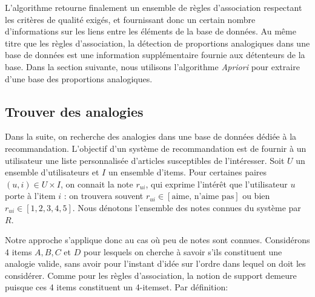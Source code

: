 L'algorithme retourne finalement un ensemble de règles d'association
respectant les critères de qualité exigés, et fournissant donc un certain
nombre d'informations sur les liens entre les éléments de la base de
données.
Au même titre que les règles d'association, la détection de proportions
analogiques dans une base de données est une information supplémentaire
fournie aux détenteurs de la base.  Dans la section suivante, nous
utilisons l'algorithme {\it Apriori} pour extraire d'une base des proportions
analogiques.

\subsection{Trouver des analogies}
Dans la suite, on recherche des analogies dans une base de données dédiée à la
recommandation.
L'objectif d'un système de recommandation est de fournir à un utilisateur une
liste personnalisée d'articles susceptibles de l'intéresser.  Soit $U$ un
ensemble d'utilisateurs et $I$ un ensemble d'items. Pour certaines paires $(u,
i) \in U \times I$, on connait la note $r_{ui}$, qui exprime l'intérêt que
l'utilisateur $u$ porte à l'item $i$ : on trouvera souvent $r_{ui} \in
[\text{aime, n'aime pas}]$ ou bien $r_{ui} \in [1, 2, 3, 4, 5]$. Nous dénotons l'ensemble des notes
connues du système par $R$.


Notre approche s'applique donc au cas o\`u peu de notes sont connues.  Considérons
4 items  $A, B, C$ et $D$ pour lesquels on cherche à savoir s'ils constituent
une analogie valide, sans avoir pour l'instant d'idée sur l'ordre dans lequel
on doit les considérer. Comme pour les règles d'association, la notion de
support demeure puisque ces 4 items constituent un 4-itemset.  Par
définition:

